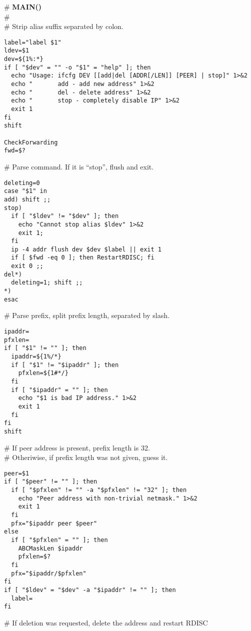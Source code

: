 \begin{flushleft}
\# {\bf MAIN()}\\
\#\\
\# Strip alias suffix separated by colon.
\end{flushleft}
\begin{verbatim}
label="label $1"
ldev=$1
dev=${1%:*}
if [ "$dev" = "" -o "$1" = "help" ]; then
  echo "Usage: ifcfg DEV [[add|del [ADDR[/LEN]] [PEER] | stop]" 1>&2
  echo "       add - add new address" 1>&2
  echo "       del - delete address" 1>&2
  echo "       stop - completely disable IP" 1>&2
  exit 1
fi
shift

CheckForwarding
fwd=$?
\end{verbatim}
\begin{flushleft}
\# Parse command. If it is ``stop'', flush and exit.
\end{flushleft}
\begin{verbatim}
deleting=0
case "$1" in
add) shift ;;
stop)
  if [ "$ldev" != "$dev" ]; then
    echo "Cannot stop alias $ldev" 1>&2
    exit 1;
  fi
  ip -4 addr flush dev $dev $label || exit 1
  if [ $fwd -eq 0 ]; then RestartRDISC; fi
  exit 0 ;;
del*)
  deleting=1; shift ;;
*)
esac
\end{verbatim}
\begin{flushleft}
\# Parse prefix, split prefix length, separated by slash.
\end{flushleft}
\begin{verbatim}
ipaddr=
pfxlen=
if [ "$1" != "" ]; then
  ipaddr=${1%/*}
  if [ "$1" != "$ipaddr" ]; then
    pfxlen=${1#*/}
  fi
  if [ "$ipaddr" = "" ]; then
    echo "$1 is bad IP address." 1>&2
    exit 1
  fi
fi
shift
\end{verbatim}
\begin{flushleft}
\# If peer address is present, prefix length is 32.\\
\# Otheriwise, if prefix length was not given, guess it.
\end{flushleft}
\begin{verbatim}
peer=$1
if [ "$peer" != "" ]; then
  if [ "$pfxlen" != "" -a "$pfxlen" != "32" ]; then
    echo "Peer address with non-trivial netmask." 1>&2
    exit 1
  fi
  pfx="$ipaddr peer $peer"
else
  if [ "$pfxlen" = "" ]; then
    ABCMaskLen $ipaddr
    pfxlen=$?
  fi
  pfx="$ipaddr/$pfxlen"
fi
if [ "$ldev" = "$dev" -a "$ipaddr" != "" ]; then
  label=
fi
\end{verbatim}
\begin{flushleft}
\# If deletion was requested, delete the address and restart RDISC
\end{flushleft}
